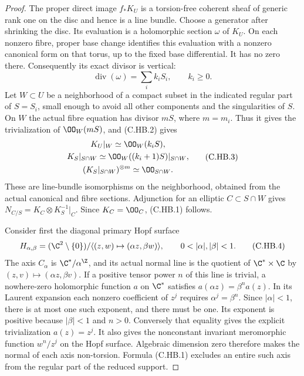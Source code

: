 \begin{proof}
The proper direct image $f_*K_U$ is a
torsion-free coherent sheaf of generic rank
one on the disc and hence is a line bundle.
Choose a generator after shrinking the disc.
Its evaluation is a holomorphic section
$\omega$ of $K_U$. On each nonzero fibre,
proper base change identifies this evaluation
with a nonzero canonical form on that torus,
up to the fixed base differential. It has
no zero there. Consequently its exact divisor
is vertical:
\[
                   \operatorname{div}(\omega)
                               =\sum_i k_iS_i,
                        \qquad k_i\ge0.              \tag{C.HB.2}
\]
Let $W\subset U$ be a neighborhood of a
compact subset in the indicated regular
part of $S=S_i$, small enough to avoid all
other components and the singularities of
$S$. On $W$ the actual fibre equation has
divisor $mS$, where $m=m_i$. Thus it gives
the trivialization of $\OO_W(mS)$, and
(C.HB.2) gives
\[
 \begin{gathered}
 K_U|_W\simeq\OO_W(k_iS),\\
 K_S|_{S\cap W}\simeq
                  \OO_W((k_i+1)S)|_{S\cap W},\\
 (K_S|_{S\cap W})^{\otimes m}\simeq\OO_{S\cap W}.
 \end{gathered}
                                                               \tag{C.HB.3}
\]
These are line-bundle isomorphisms on the
neighborhood, obtained from the actual
canonical and fibre sections. Adjunction
for an elliptic $C\subset S\cap W$ gives
$N_{C/S}=K_C\otimes K_S^{-1}|_C$.
Since $K_C=\OO_C$, (C.HB.1) follows.

Consider first the diagonal primary
Hopf surface
\[
 H_{\alpha,\beta}=(\C^2\setminus\{0\})/
       \langle(z,w)\mapsto(\alpha z,\beta w)\rangle,
                    \qquad0<|\alpha|,|\beta|<1.
                                                               \tag{C.HB.4}
\]
The axis $C_\alpha$ is $\C^*/\alpha^{\Z}$,
and its actual normal line is the quotient
of $\C^*\times\C$ by
$(z,v)\mapsto(\alpha z,\beta v)$.
If a positive tensor power $n$ of this
line is trivial, a nowhere-zero holomorphic
function $a$ on $\C^*$ satisfies
$a(\alpha z)=\beta^n a(z)$.
In its Laurent expansion each nonzero
coefficient of $z^j$ requires
$\alpha^j=\beta^n$. Since $|\alpha|<1$,
there is at most one such exponent, and
there must be one. Its exponent is positive
because $|\beta|<1$ and $n>0$.
Conversely that equality gives the
explicit trivialization $a(z)=z^j$.
It also gives the nonconstant invariant
meromorphic function $w^n/z^j$ on the
Hopf surface. Algebraic dimension zero
therefore makes the normal of each axis
non-torsion. Formula (C.HB.1) excludes
an entire such axis from the regular
part of the reduced support.


\end{proof}
